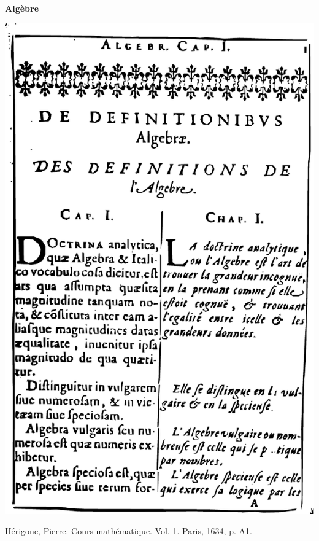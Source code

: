 \documentclass[a4paper,12pt]{article}
\begin{document}
\setlength{\cftbeforesecskip}{2pt}

\setlength{\cftsecindent}{1em}

\begin{center}
	{\bfseries \Huge Algèbre}

	\includegraphics[scale=0.6]{../medias/1M/fiches/algebreFront}


Hérigone, Pierre. Cours mathématique. Vol. 1. Paris, 1634, p. A1.
\end{center}

\vspace{-1cm}
\end{document}
